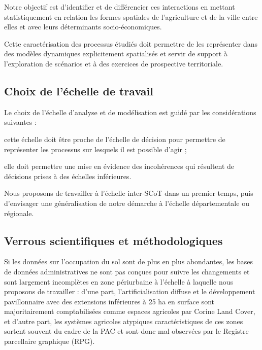 \stopitemize

Notre objectif est d'identifier et de différencier ces interactions
en mettant statistiquement en relation les formes spatiales
de l'agriculture et de la ville entre elles
et avec leurs déterminants socio-économiques.

Cette caractérisation des processus étudiés doit permettre
de les représenter dans des modèles dynamiques explicitement
spatialisés et servir de support à l'exploration de scénarios
et à des exercices de prospective territoriale.


\subsection{Choix de l'échelle de travail}

Le choix de l'échelle d'analyse et de modélisation est guidé
par les considérations suivantes :

\startitemize

\item cette échelle doit être proche de l'échelle de décision
  pour permettre de représenter les processus sur lesquels il est possible
  d'agir ;

\item elle doit permettre une mise en évidence des incohérences
  qui résultent de décisions prises
  à des échelles inférieures.

\stopitemize

Nous proposons de travailler à l'échelle inter-SCoT dans un premier temps,
puis d'envisager une généralisation de notre démarche
à l'échelle départementale ou régionale.


\subsection
{Verrous scientifiques et méthodologiques}

Si les données sur l'occupation du sol sont de plus en plus abondantes,
les bases de données administratives ne sont pas conçues pour
suivre les changements et sont largement incomplètes en zone périurbaine à
l'échelle à laquelle nous proposons de travailler :
d'une part, l'artificialisation diffuse et le développement pavillonnaire
avec des extensions inférieures à 25 ha en surface sont majoritairement
comptabilisées comme espaces agricoles par Corine Land Cover, et d'autre part,
les systèmes agricoles atypiques caractéristiques de ces zones
sortent souvent du cadre de la PAC et sont donc mal
observées par le Registre parcellaire graphique (RPG).

